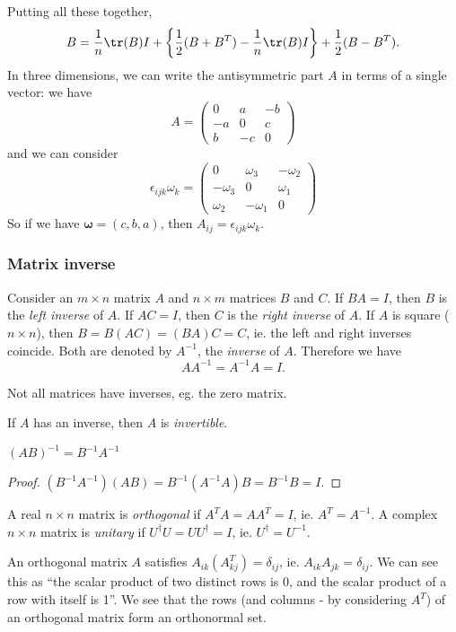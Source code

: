 \documentclass[a4paper]{article}
\begin{document}
Putting all these together,
\[
  B = \frac{1}{n}\tr(B)I + \left\{\frac{1}{2}(B + B^T) - \frac{1}{n}\tr(B)I\right\} + \frac{1}{2}(B - B^T).
\]
In three dimensions, we can write the antisymmetric part $A$ in terms of a single vector: we have
\[
  A = \begin{pmatrix}
    0 & a & -b\\
    -a & 0 & c\\
    b & -c & 0
  \end{pmatrix}
\]
and we can consider
\[
  \epsilon_{ijk}\omega_k =
  \begin{pmatrix}
    0 & \omega_3 & -\omega_2\\
    -\omega_3 & 0 & \omega_1\\
    \omega_2 & -\omega_1 & 0
  \end{pmatrix}
\]
So if we have $\mathbf{\omega} = (c, b, a)$, then $A_{ij} = \epsilon_{ijk}\omega_k$.

\subsubsection{Matrix inverse}

\begin{defi}
  Consider an $m\times n$ matrix $A$ and $n\times m$ matrices $B$ and $C$. If $BA = I$, then $B$ is the \emph{left inverse} of $A$. If $AC = I$, then $C$ is the \emph{right inverse} of $A$. If $A$ is square ($n\times n$), then $B = B(AC) = (BA)C = C$, ie. the left and right inverses coincide. Both are denoted by $A^{-1}$, the \emph{inverse} of $A$. Therefore we have
  \[
    AA^{-1} = A^{-1}A = I.
  \]
\end{defi}
\note Not all matrices have inverses, eg. the zero matrix.
\begin{defi}
  If $A$ has an inverse, then $A$ is \emph{invertible}.
\end{defi}

\begin{prop}
  $(AB)^{-1} = B^{-1}A^{-1}$
\end{prop}

\begin{proof}
  $(B^{-1}A^{-1})(AB) = B^{-1}(A^{-1}A)B = B^{-1}B = I$.
\end{proof}

\begin{defi}
  A real $n\times n$ matrix is \emph{orthogonal} if $A^TA = AA^T = I$, ie. $A^T = A^{-1}$. A complex $n\times n$ matrix is \emph{unitary} if $U^\dagger U = UU^\dagger = I$, ie. $U^\dagger = U^{-1}$.
\end{defi}
\note An orthogonal matrix $A$ satisfies $A_{ik}(A^T_{kj}) = \delta_{ij}$, ie. $A_{ik}A_{jk} = \delta_{ij}$. We can see this as ``the scalar product of two distinct rows is 0, and the scalar product of a row with itself is 1''. We see that the rows (and columns - by considering $A^T$) of an orthogonal matrix form an orthonormal set.
\end{document}
